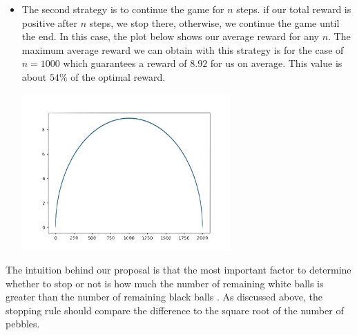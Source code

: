\begin{solution}
\begin{itemize}
\item The second strategy is to continue the game for $n$ steps. if our total reward is positive after $n$ steps, we stop there, otherwise, we continue the game until the end. In this case, the plot below shows our average reward for any $n$. The maximum average reward we can obtain with this strategy is for the case of $n=1000$ which guarantees a reward of $8.92$ for us on average. This value is about $54\%$ of the optimal reward.

\begin{center}
	\includegraphics[width=8cm]{20/figs/20_diagram2.jpg}
\end{center}
\end{itemize}


The intuition behind our proposal is that the most important factor to determine whether to stop or not is how much the number of remaining white balls  is greater than the number of remaining black balls . As discussed above, the stopping rule should compare the difference to the square root of the number of pebbles.
\end{solution}